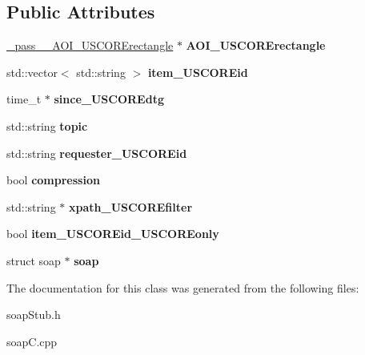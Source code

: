 \subsection*{Public Attributes}
\begin{DoxyCompactItemize}
\item 
\hypertarget{class__pass____sync_aea6ed59b74ddf893e24996a045a98bf6}{
\hyperlink{class__pass____AOI__USCORErectangle}{\_\-pass\_\-\_\-AOI\_\-USCORErectangle} $\ast$ {\bfseries AOI\_\-USCORErectangle}}
\label{class__pass____sync_aea6ed59b74ddf893e24996a045a98bf6}

\item 
\hypertarget{class__pass____sync_aaafefb5dae4ceefe41f3b28ec86bc9e7}{
std::vector$<$ std::string $>$ {\bfseries item\_\-USCOREid}}
\label{class__pass____sync_aaafefb5dae4ceefe41f3b28ec86bc9e7}

\item 
\hypertarget{class__pass____sync_a98822d07e944abaa38890b029b8d3843}{
time\_\-t $\ast$ {\bfseries since\_\-USCOREdtg}}
\label{class__pass____sync_a98822d07e944abaa38890b029b8d3843}

\item 
\hypertarget{class__pass____sync_a4b8d19cca9e59d18092d67076cd7dd84}{
std::string {\bfseries topic}}
\label{class__pass____sync_a4b8d19cca9e59d18092d67076cd7dd84}

\item 
\hypertarget{class__pass____sync_ac16d9d34474be98f97f65d765a5bc36f}{
std::string {\bfseries requester\_\-USCOREid}}
\label{class__pass____sync_ac16d9d34474be98f97f65d765a5bc36f}

\item 
\hypertarget{class__pass____sync_a99f4d6464d5619cda2450b82a86d920a}{
bool {\bfseries compression}}
\label{class__pass____sync_a99f4d6464d5619cda2450b82a86d920a}

\item 
\hypertarget{class__pass____sync_aeb08d68c5fbb5a8aee0a46ece2ae5e85}{
std::string $\ast$ {\bfseries xpath\_\-USCOREfilter}}
\label{class__pass____sync_aeb08d68c5fbb5a8aee0a46ece2ae5e85}

\item 
\hypertarget{class__pass____sync_a0fb8052e1937b54e6ddcc7bb8769fe11}{
bool {\bfseries item\_\-USCOREid\_\-USCOREonly}}
\label{class__pass____sync_a0fb8052e1937b54e6ddcc7bb8769fe11}

\item 
\hypertarget{class__pass____sync_a269cee404a896a0d181da6ea2d59aa57}{
struct soap $\ast$ {\bfseries soap}}
\label{class__pass____sync_a269cee404a896a0d181da6ea2d59aa57}

\end{DoxyCompactItemize}


The documentation for this class was generated from the following files:\begin{DoxyCompactItemize}
\item 
soapStub.h\item 
soapC.cpp\end{DoxyCompactItemize}

